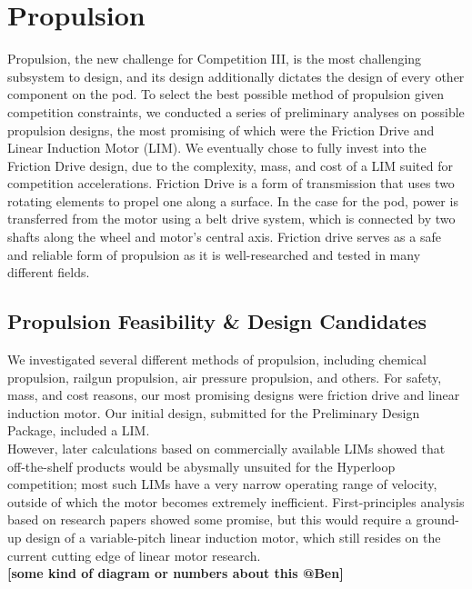 \documentclass[main.tex]{subfiles}
\begin{document}
    \chapter{Propulsion}
    \label{ch:propulsion}
    Propulsion, the new challenge for Competition III, is the most challenging subsystem to design, and its design additionally dictates the design of every other component on the pod. To select the best possible method of propulsion given competition constraints, we conducted a series of preliminary analyses on possible propulsion designs, the most promising of which were the Friction Drive and Linear Induction Motor (LIM). We eventually chose to fully invest into the Friction Drive design, due to the complexity, mass, and cost of a LIM suited for competition accelerations. Friction Drive is a form of transmission that uses two rotating elements to propel one along a surface. In the case for the pod, power is transferred from the motor using a belt drive system, which is connected by two shafts along the wheel and motor’s central axis. Friction drive serves as a safe and reliable form of propulsion as it is well-researched and tested in many different fields.

    \section{Propulsion Feasibility \& Design Candidates}
    We investigated several different methods of propulsion, including chemical propulsion, railgun propulsion, air pressure propulsion, and others. For safety, mass, and cost reasons, our most promising designs were friction drive and linear induction motor. Our initial design, submitted for the Preliminary Design Package, included a LIM.\\

    However, later calculations based on commercially available LIMs showed that off-the-shelf products would be abysmally unsuited for the Hyperloop competition; most such LIMs have a very narrow operating range of velocity, outside of which the motor becomes extremely inefficient. First-principles analysis based on research papers showed some promise, but this would require a ground-up design of a variable-pitch linear induction motor, which still resides on the current cutting edge of linear motor research.\\

   \textbf{ [some kind of diagram or numbers about this @Ben]}\\
\end{document}
